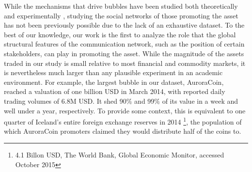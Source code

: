 
While the mechanisms that drive bubbles have been studied both theoretically 
\cite{abolafia1988enacting,earl2007decision,bakker2010social,harras2011grow}
and experimentally
\cite{moinas2013bubble},
studying the social networks of those promoting the asset has not been previously possible due to the lack of an exhaustive dataset. To the best of our knowledge, our work is the first to analyze the role that the global structural features of the communication network, such as the position of certain stakeholders, can play in promoting the asset.
While the magnitude of the assets traded in our study is small relative to most financial and commodity markets, it is nevertheless much larger than
any plausible experiment in an academic environment.
For example, the largest bubble in our dataset, AuroraCoin, reached a valuation of one billion USD in March 2014,
with reported daily trading volumes of 6.8M USD. It shed 90\% and 99\% of its value in a week and well under a year, respectively.
To provide some context, this is equivalent to one quarter of Iceland's entire foreign exchange reserves in 2014 \footnote{4.1 Billon USD, The World Bank, Global Economic Monitor, accessed October 2015}, the population of which AuroraCoin promoters claimed they would distribute half of the coins to.

